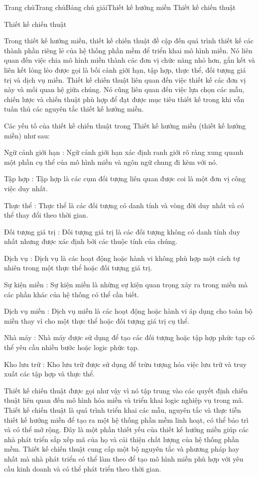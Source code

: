 
Trang chủTrang chủBảng chú giảiThiết kế hướng miền Thiết kế chiến thuật

Thiết kế chiến thuật

Trong thiết kế hướng miền, thiết kế chiến thuật đề cập đến quá trình thiết kế các thành phần riêng lẻ của hệ thống phần mềm để triển khai mô hình miền. Nó liên quan đến việc chia mô hình miền thành các đơn vị chức năng nhỏ hơn, gắn kết và liên kết lỏng lẻo được gọi là bối cảnh giới hạn, tập hợp, thực thể, đối tượng giá trị và dịch vụ miền. Thiết kế chiến thuật liên quan đến việc thiết kế các đơn vị này và mối quan hệ giữa chúng. Nó cũng liên quan đến việc lựa chọn các mẫu, chiến lược và chiến thuật phù hợp để đạt được mục tiêu thiết kế trong khi vẫn tuân thủ các nguyên tắc thiết kế hướng miền.

Các yếu tố của thiết kế chiến thuật trong Thiết kế hướng miền (thiết kế hướng miền) như sau:

Ngữ cảnh giới hạn : Ngữ cảnh giới hạn xác định ranh giới rõ ràng xung quanh một phần cụ thể của mô hình miền và ngôn ngữ chung đi kèm với nó.

Tập hợp : Tập hợp là các cụm đối tượng liên quan được coi là một đơn vị công việc duy nhất.

Thực thể : Thực thể là các đối tượng có danh tính và vòng đời duy nhất và có thể thay đổi theo thời gian.

Đối tượng giá trị : Đối tượng giá trị là các đối tượng không có danh tính duy nhất nhưng được xác định bởi các thuộc tính của chúng.

Dịch vụ : Dịch vụ là các hoạt động hoặc hành vi không phù hợp một cách tự nhiên trong một thực thể hoặc đối tượng giá trị.

Sự kiện miền : Sự kiện miền là những sự kiện quan trọng xảy ra trong miền mà các phần khác của hệ thống có thể cần biết.

Dịch vụ miền : Dịch vụ miền là các hoạt động hoặc hành vi áp dụng cho toàn bộ miền thay vì cho một thực thể hoặc đối tượng giá trị cụ thể.

Nhà máy : Nhà máy được sử dụng để tạo các đối tượng hoặc tập hợp phức tạp có thể yêu cầu nhiều bước hoặc logic phức tạp.

Kho lưu trữ : Kho lưu trữ được sử dụng để trừu tượng hóa việc lưu trữ và truy xuất các tập hợp và thực thể.

Thiết kế chiến thuật được gọi như vậy vì nó tập trung vào các quyết định chiến thuật liên quan đến mô hình hóa miền và triển khai logic nghiệp vụ trong mã. Thiết kế chiến thuật là quá trình triển khai các mẫu, nguyên tắc và thực tiễn thiết kế hướng miền để tạo ra một hệ thống phần mềm linh hoạt, có thể bảo trì và có thể mở rộng. Đây là một phần thiết yếu của thiết kế hướng miền giúp các nhà phát triển sắp xếp mã của họ và cải thiện chất lượng của hệ thống phần mềm. Thiết kế chiến thuật cung cấp một bộ nguyên tắc và phương pháp hay nhất mà nhà phát triển có thể làm theo để tạo mô hình miền phù hợp với yêu cầu kinh doanh và có thể phát triển theo thời gian.

